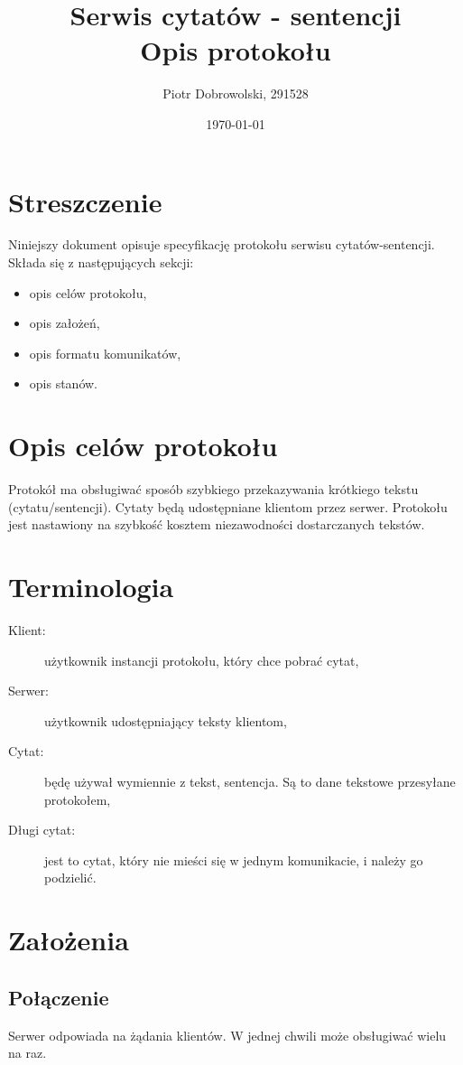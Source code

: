 \documentclass{article}
\author{Piotr Dobrowolski, 291528}
\title{Serwis cytatów - sentencji \\ Opis protokołu}
\date{\today}
\begin{document}
\maketitle
\tableofcontents
\clearpage

\section{Streszczenie}
Niniejszy dokument opisuje specyfikację protokołu serwisu cytatów-sentencji.
Składa się z następujących sekcji:
\begin{itemize}
\item opis celów protokołu,
\item opis założeń,
\item opis formatu komunikatów,
\item opis stanów.
\end{itemize}


\section{Opis celów protokołu}
Protokół ma obsługiwać sposób szybkiego przekazywania krótkiego tekstu (cytatu/sentencji).
Cytaty będą udostępniane klientom przez serwer.
Protokołu jest nastawiony na szybkość kosztem niezawodności dostarczanych tekstów.


\section{Terminologia}
\begin{description}
\item[Klient: ] użytkownik instancji protokołu, który chce pobrać cytat,
\item[Serwer: ] użytkownik udostępniający teksty klientom,
\item[Cytat: ] będę używał wymiennie z tekst, sentencja. Są to dane tekstowe przesyłane protokołem,
\item[Długi cytat: ] jest to cytat, który nie mieści się w jednym komunikacie, i należy go podzielić.
\end{description}


\section{Założenia}
\subsection{Połączenie}
Serwer odpowiada na żądania klientów. W jednej chwili może obsługiwać wielu na raz.
\end{document}
